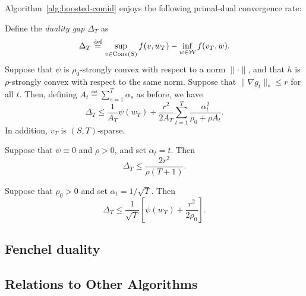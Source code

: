 \documentclass[paper.tex]{subfiles}
\begin{document}
Algorithm~\ref{alg:boosted-comid} enjoys the following primal-dual convergence rate:
\begin{theorem}
Define the \emph{duality gap} $\Delta_T$ as
\[ \Delta_T \stackrel{\mathrm{def}}{=} \sup_{v \in \operatorname{Conv}(S)} f(v, w_T) - \inf_{w \in \mathcal{W}} f(v_T, w). \]
Suppose that $\psi$ is $\rho_0$-strongly convex with 
respect to a norm $\|\cdot\|$, and that $h$ is $\rho$-strongly 
convex with respect to the same norm. Suppose that 
$\|\nabla g_t\|_* \leq r$ for all $t$. Then, defining 
$A_t \eqdef \sum_{s=1}^T \alpha_s$ as before, we have
\[ \Delta_T \leq \frac{1}{A_T} \psi(w_T) + \frac{r^2}{2A_T} \sum_{t=1}^T \frac{\alpha_t^2}{\rho_0 + \rho A_t}. \]
In addition, $v_T$ is $(S, T)$-sparse.
\end{theorem}
\begin{corollary}
Suppose that $\psi \equiv 0$ and $\rho > 0$, and set $\alpha_t = t$. Then 
\[ \Delta_T \leq \frac{2r^2}{\rho (T+1)}. \]
\end{corollary}

\begin{corollary}
Suppose that $\rho_0 > 0$ and set $\alpha_t = 1/\sqrt{T}$. Then
\[ \Delta_T \leq \frac{1}{\sqrt{T}} \left[ \psi(w_T) + \frac{r^2}{2\rho_0} \right]. \]
\end{corollary}

\subsection{Fenchel duality}
\label{sec:fenchel}

\subsection{Relations to Other Algorithms}
\label{sec:derived}
\end{document}
